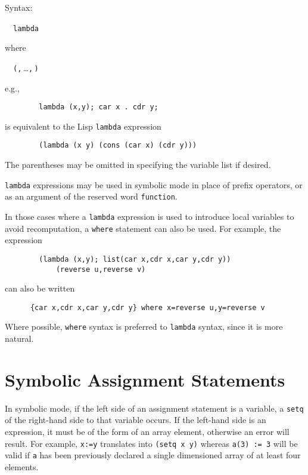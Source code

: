 Syntax:
\begin{syntax}
  \ \BNFprod\
    \texttt{lambda } 
\end{syntax}
 where
\begin{syntax}
  \ \BNFprod\ \texttt{(}\texttt{,}\,\dots\texttt{,}\,\texttt{)}
\end{syntax}
e.g.,
\begin{verbatim}
        lambda (x,y); car x . cdr y;
\end{verbatim}
is equivalent to the Lisp \texttt{lambda} expression
\begin{verbatim}
        (lambda (x y) (cons (car x) (cdr y)))
\end{verbatim}
The parentheses may be omitted in specifying the variable list if desired.

\texttt{lambda} expressions may be used in symbolic mode in place of prefix
operators, or as an argument of the reserved word \hypertarget{reserved:FUNCTION}{\texttt{function}}.

In those cases where a \texttt{lambda} expression is used to introduce local
variables to avoid recomputation, a \texttt{where} statement can also be
used.  For example, the expression
\begin{verbatim}
        (lambda (x,y); list(car x,cdr x,car y,cdr y))
            (reverse u,reverse v)
\end{verbatim}
can also be written
\begin{verbatim}
      {car x,cdr x,car y,cdr y} where x=reverse u,y=reverse v
\end{verbatim}
Where possible, \texttt{where} syntax is preferred to \texttt{lambda} syntax,
since it is more natural.

\section{Symbolic Assignment Statements}
\index{Symbolic mode!assignment}
\hypertarget{command:SETQ}{}

In symbolic mode, if the left side of an assignment statement is a
variable, a \texttt{setq} of the right-hand side to that variable occurs.  If
the left-hand side is an expression, it must be of the form of an array
element, otherwise an error will result.  For example, \texttt{x:=y}
translates into \texttt{(setq x y)} whereas \texttt{a(3) := 3} will be valid if
\texttt{a} has been previously declared a single dimensioned array of at
least four elements.

